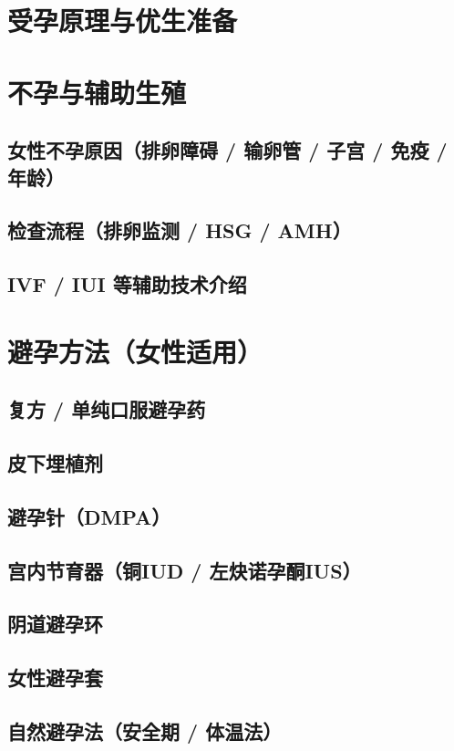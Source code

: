 \begin{enumerate}
\section{受孕原理与优生准备}

\section{不孕与辅助生殖}
\subsection{女性不孕原因（排卵障碍 / 输卵管 / 子宫 / 免疫 / 年龄）}
\subsection{检查流程（排卵监测 / HSG / AMH）}
\subsection{IVF / IUI 等辅助技术介绍}

\section{避孕方法（女性适用）}
\subsection{复方 / 单纯口服避孕药}
\subsection{皮下埋植剂}
\subsection{避孕针（DMPA）}
\subsection{宫内节育器（铜IUD / 左炔诺孕酮IUS）}
\subsection{阴道避孕环}
\subsection{女性避孕套}
\subsection{自然避孕法（安全期 / 体温法）}

\end{enumerate}
